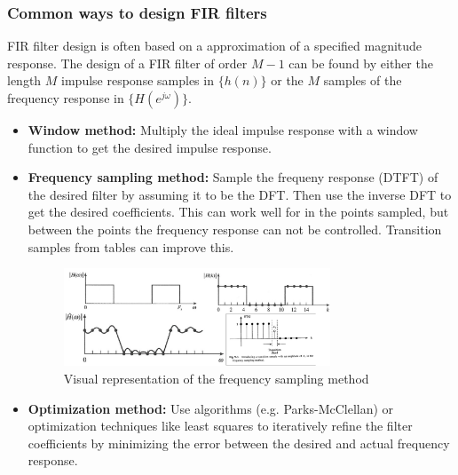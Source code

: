 \documentclass{article}
\begin{document}
\subsubsection{Common ways to design FIR filters}
FIR filter design is often based on a approximation of a specified magnitude response. The design of a FIR filter of order $M-1$ can be found by either the length $M$ impulse response samples in $\{ h(n) \}$ or the $M$ samples of the frequency response in $\{ H(e^{j\omega}) \}$.
\begin{itemize}
    \item \textbf{Window method:} Multiply the ideal impulse response with a window function to get the desired impulse response.
    \item \textbf{Frequency sampling method:} Sample the frequeny response (DTFT) of the desired filter by assuming it to be the DFT. Then use the inverse DFT to get the desired coefficients. This can work well for in the points sampled, but between the points the frequency response can not be controlled. Transition samples from tables can improve this.
    \begin{figure}[h!]
        \centering
        \includegraphics[width=0.75\textwidth]{figures/Filter design/frequency_sampling_method.png}
        \caption{Visual representation of the frequency sampling method}
        \label{fig:freq_sampling_method}
    \end{figure}
    
    \item \textbf{Optimization method:} Use algorithms (e.g. Parks-McClellan) or optimization techniques like least squares to iteratively refine the filter coefficients by minimizing the error between the desired and actual frequency response.
\end{itemize}
\end{document}
